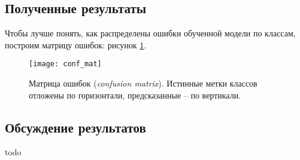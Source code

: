 \subsection{Полученные результаты}

\indent
\indent
Чтобы лучше понять, как распределены ошибки обученной модели по классам,
построим матрицу ошибок: рисунок \ref{tikzpicture: conf_mat}.

\begin{figure}[h!]
    \begin{center}
   	    \texttt{[image: conf\_mat]}
   	\end{center}
   	\caption{Матрица ошибок (\textit{confusion matrix}). Истинные метки 
   	               классов отложены по горизонтали, предсказанные -- по вертикали.}
   	\label{tikzpicture: conf_mat}
\end{figure}


\indent
\indent




\subsection{Обсуждение результатов}
todo
